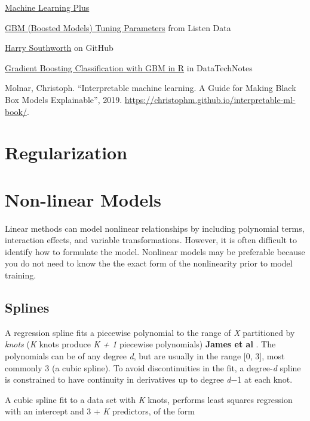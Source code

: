 \documentclass[
]{book}
\begin{document}
\href{https://www.machinelearningplus.com/machine-learning/caret-package/}{Machine Learning Plus}

\href{https://www.listendata.com/2015/07/gbm-boosted-models-tuning-parameters.html}{GBM (Boosted Models) Tuning Parameters} from Listen Data

\href{https://github.com/harrysouthworth/gbm/blob/master/demo/bernoulli.R}{Harry Southworth} on GitHub

\href{https://www.datatechnotes.com/2018/03/classification-with-gradient-boosting.html}{Gradient Boosting Classification with GBM in R} in DataTechNotes

Molnar, Christoph. ``Interpretable machine learning. A Guide for Making Black Box Models Explainable'', 2019. \url{https://christophm.github.io/interpretable-ml-book/}.

\hypertarget{regularization}{%
\chapter{Regularization}\label{regularization}}

\hypertarget{non-linear-models}{%
\chapter{Non-linear Models}\label{non-linear-models}}

Linear methods can model nonlinear relationships by including polynomial terms, interaction effects, and variable transformations. However, it is often difficult to identify how to formulate the model. Nonlinear models may be preferable because you do not need to know the the exact form of the nonlinearity prior to model training.

\hypertarget{splines}{%
\section{Splines}\label{splines}}

A regression spline fits a piecewise polynomial to the range of \emph{X} partitioned by \emph{knots} (\emph{K} knots produce \emph{K + 1} piecewise polynomials) \textbf{James et al} \citep{James2013}. The polynomials can be of any degree \emph{d}, but are usually in the range {[}0, 3{]}, most commonly 3 (a cubic spline). To avoid discontinuities in the fit, a degree-\emph{d} spline is constrained to have continuity in derivatives up to degree \emph{d}−1 at each knot.

A cubic spline fit to a data set with \emph{K} knots, performs least squares regression with an intercept and 3 + \emph{K} predictors, of the form
\end{document}
